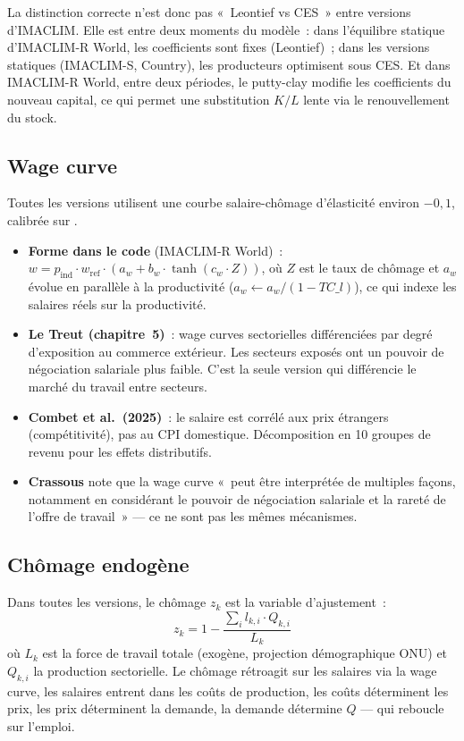 La distinction correcte n'est donc pas «~Leontief vs CES~» entre versions d'IMACLIM. Elle est entre deux moments du modèle~: dans l'équilibre statique d'IMACLIM-R World, les coefficients sont fixes (Leontief)~; dans les versions statiques (IMACLIM-S, Country), les producteurs optimisent sous CES. Et dans IMACLIM-R World, entre deux périodes, le putty-clay modifie les coefficients du nouveau capital, ce qui permet une substitution $K/L$ lente via le renouvellement du stock.

\subsection{Wage curve}

Toutes les versions utilisent une courbe salaire-chômage d'élasticité environ $-0,1$, calibrée sur \textcite{blanchflower_introduction_1995}.

\begin{itemize}
\item \textbf{Forme dans le code} (IMACLIM-R World)~: $w = p_{\mathrm{ind}} \cdot w_{\mathrm{ref}} \cdot (a_w + b_w \cdot \tanh(c_w \cdot Z))$, où $Z$ est le taux de chômage et $a_w$ évolue en parallèle à la productivité ($a_w \leftarrow a_w / (1 - \mathit{TC\_l})$), ce qui indexe les salaires réels sur la productivité.
\item \textbf{Le Treut (chapitre~5)}~: wage curves sectorielles différenciées par degré d'exposition au commerce extérieur. Les secteurs exposés ont un pouvoir de négociation salariale plus faible. C'est la seule version qui différencie le marché du travail entre secteurs.
\item \textbf{Combet et al.\ (2025)}~: le salaire est corrélé aux prix étrangers (compétitivité), pas au CPI domestique. Décomposition en 10 groupes de revenu pour les effets distributifs.
\item \textbf{Crassous} note que la wage curve «~peut être interprétée de multiples façons, notamment en considérant le pouvoir de négociation salariale et la rareté de l'offre de travail~» --- ce ne sont pas les mêmes mécanismes.
\end{itemize}

\subsection{Chômage endogène}

Dans toutes les versions, le chômage $z_k$ est la variable d'ajustement~:
\begin{equation}
z_k = 1 - \frac{\sum_i l_{k,i} \cdot Q_{k,i}}{L_k}
\end{equation}
où $L_k$ est la force de travail totale (exogène, projection démographique ONU) et $Q_{k,i}$ la production sectorielle. Le chômage rétroagit sur les salaires via la wage curve, les salaires entrent dans les coûts de production, les coûts déterminent les prix, les prix déterminent la demande, la demande détermine $Q$ --- qui reboucle sur l'emploi.

